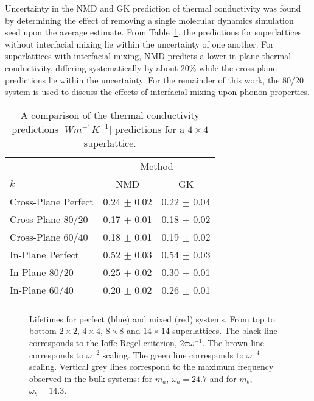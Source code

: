 \documentclass[aps,prb,preprint,preprintnumbers,amsmath,amssymb,floatfix,superscriptaddress]{revtex4}
\begin{document}
Uncertainty in the NMD and GK prediction of thermal conductivity was found by determining the effect of removing a single molecular dynamics simulation seed upon the average estimate. From Table~\ref{TB:validate}, the predictions for superlattices without interfacial mixing lie within the uncertainty of one another. For superlattices with interfacial mixing, NMD predicts a lower in-plane thermal conductivity, differing systematically by about 20\% while the cross-plane predictions lie within the uncertainty. For the remainder of this work, the 80/20 system is used to discuss the effects of interfacial mixing upon phonon properties.
\begin{table}
\begin{center}
\begin{tabular}{lcc}
\hline\noalign{\smallskip}
&\multicolumn{2}{c}{Method} \\
\cline{2-3}\noalign{\smallskip}
$k$ & NMD  & GK  \\
\noalign{\smallskip}\hline\noalign{\smallskip}
Cross-Plane Perfect  & 0.24 $\pm$ 0.02 & 0.22 $\pm$ 0.04\\
Cross-Plane 80/20    & 0.17  $\pm$ 0.01   &   0.18 $\pm$ 0.02 \\
Cross-Plane 60/40    & 0.18  $\pm$ 0.01   &   0.19 $\pm$ 0.02 \\
In-Plane Perfect   & 0.52 $\pm$ 0.03 & 0.54 $\pm$ 0.03  \\
In-Plane 80/20  & 0.25 $\pm$ 0.02 & 0.30 $\pm$ 0.01  \\
In-Plane 60/40   & 0.20 $\pm$ 0.02 & 0.26 $\pm$ 0.01  \\
\noalign{\smallskip}\hline
\end{tabular}
\end{center}
\renewcommand{\table}{Table.}
\caption{A comparison of the thermal conductivity predictions [$Wm^{-1}K^{-1}$] predictions for a $4\times4$ superlattice.}
\label{TB:validate}
\end{table}
\renewcommand{\textfraction}{0.0}
\begin{figure}%
\begin{center}
\renewcommand{\figure}{Fig.}
\caption{Lifetimes for perfect (blue) and mixed (red) systems. From top to bottom $2\times2$, $4\times4$, $8\times8$ and $14\times14$ superlattices. The black line corresponds to the Ioffe-Regel criterion, $2\pi\omega^{-1}$. The brown line corresponds to $\omega^{-2}$ scaling. The green line corresponds to $\omega^{-4}$ scaling. Vertical grey lines correspond to the maximum frequency observed in the bulk systems: for $m_a$, $\omega_a=24.7$ and for $m_b$, $\omega_b=14.3$. } 
\label{FIG:lifetime}
\end{center}
\end{figure}
\end{document}
